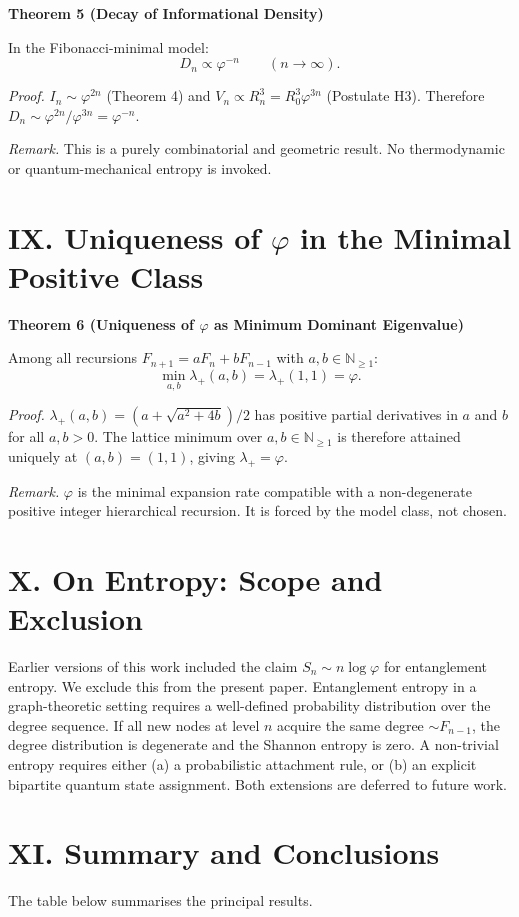 \documentclass[12pt]{article}
\newcommand{\ph}{\varphi}
\newcommand{\N}{\mathbb{N}}
\begin{document}
\textbf{Theorem 5 (Decay of Informational Density)}

In the Fibonacci-minimal model:
\[
D_n\propto \ph^{-n}\qquad (n\to\infty).
\]

\textit{Proof.} $I_n\sim \ph^{2n}$ (Theorem 4) and $V_n\propto R_n^3=R_0^3\ph^{3n}$ (Postulate H3). Therefore $D_n\sim \ph^{2n}/\ph^{3n}=\ph^{-n}$.

\textit{Remark.} This is a purely combinatorial and geometric result. No thermodynamic or quantum-mechanical entropy is invoked.

\section*{IX. Uniqueness of $\ph$ in the Minimal Positive Class}
\textbf{Theorem 6 (Uniqueness of $\ph$ as Minimum Dominant Eigenvalue)}

Among all recursions $F_{n+1}=aF_n+bF_{n-1}$ with $a,b\in\N_{\ge 1}$:
\[
\min_{a,b}\lambda_+(a,b)=\lambda_+(1,1)=\ph.
\]

\textit{Proof.} $\lambda_+(a,b)=(a+\sqrt{a^2+4b})/2$ has positive partial derivatives in $a$ and $b$ for all $a,b>0$. The lattice minimum over $a,b\in\N_{\ge 1}$ is therefore attained uniquely at $(a,b)=(1,1)$, giving $\lambda_+=\ph$.

\textit{Remark.} $\ph$ is the minimal expansion rate compatible with a non-degenerate positive integer hierarchical recursion. It is forced by the model class, not chosen.

\section*{X. On Entropy: Scope and Exclusion}
Earlier versions of this work included the claim $S_n\sim n\log\ph$ for entanglement entropy. We exclude this from the present paper. Entanglement entropy in a graph-theoretic setting requires a well-defined probability distribution over the degree sequence. If all new nodes at level $n$ acquire the same degree $\sim F_{n-1}$, the degree distribution is degenerate and the Shannon entropy is zero. A non-trivial entropy requires either (a) a probabilistic attachment rule, or (b) an explicit bipartite quantum state assignment. Both extensions are deferred to future work.

\section*{XI. Summary and Conclusions}
The table below summarises the principal results.
\end{document}
